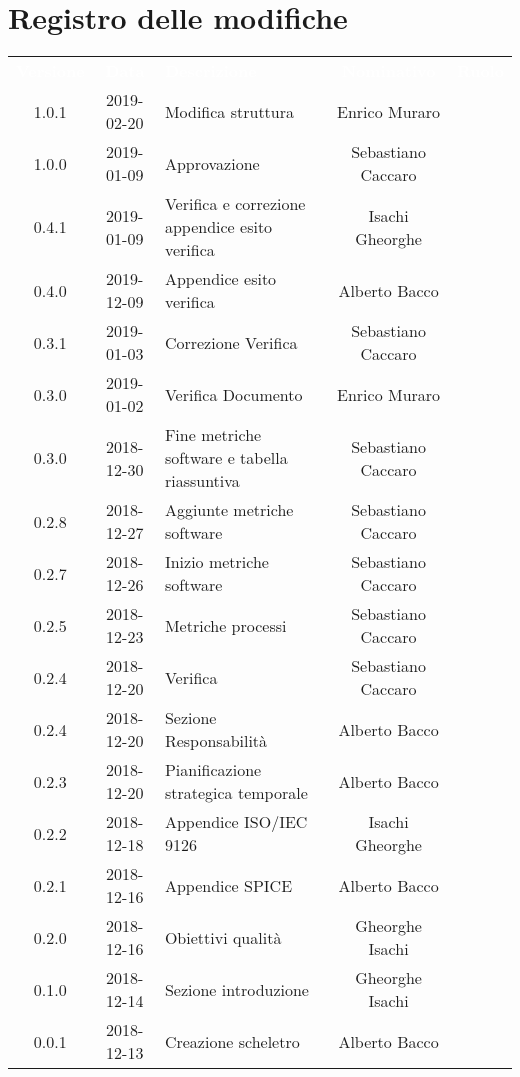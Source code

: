 \section*{Registro delle modifiche}
{
	\renewcommand{\arraystretch}{1.5}
	\centering
	\begin{longtable}{c c C{4cm} c  c }
		\textcolor{white}{\textbf{Versione}} &
		\textcolor{white}{\textbf{Data}} &
		\textcolor{white}{\textbf{Descrizione}} &
		\textcolor{white}{\textbf{Nominativo}} &
		\textcolor{white}{\textbf{Ruolo}}
		\\
		1.0.1 &
		2019-02-20 &
		Modifica struttura &
		Enrico Muraro &
		\reda{}
		\\
		1.0.0 &
		2019-01-09 &
		Approvazione &
		Sebastiano Caccaro &
		\Res{}
		\\
		0.4.1 &
		2019-01-09 &
		Verifica e correzione appendice esito verifica &
		Isachi Gheorghe &
		\ver{}
		\\
		0.4.0 &
		2019-12-09 &
		Appendice esito verifica &
		Alberto Bacco &
		\ver{}
		\\
		0.3.1 &
		2019-01-03 &
		Correzione Verifica &
		Sebastiano Caccaro &
		\reda{}
		\\
		0.3.0 &
		2019-01-02 &
		Verifica Documento &
		Enrico Muraro &
		\ver{}
		\\
		0.3.0 &
		2018-12-30 &
		Fine metriche software e tabella riassuntiva &
		Sebastiano Caccaro &
		\reda{}
		\\
		0.2.8 &
		2018-12-27 &
		Aggiunte metriche software  &
		Sebastiano Caccaro &
		\reda{}
		\\
		0.2.7 &
		2018-12-26 &
		Inizio metriche software &
		Sebastiano Caccaro &
		\reda{}
		\\
		0.2.5 &
		2018-12-23 &
		Metriche processi &
		Sebastiano Caccaro &
		\reda{}
		\\
		0.2.4 &
		2018-12-20 &
		Verifica &
		Sebastiano Caccaro &
		\reda{}		
		\\
		0.2.4 &
		2018-12-20 &
		Sezione Responsabilità &
		Alberto Bacco &
		\reda{}
		\\
		0.2.3 &
		2018-12-20 &
		Pianificazione strategica temporale &
		Alberto Bacco &
		\reda{}
		\\
		0.2.2 &
		2018-12-18 &
		Appendice ISO/IEC 9126 &
		Isachi Gheorghe &
		\reda{}
		\\
		0.2.1 &
		2018-12-16 &
		Appendice SPICE &
		Alberto Bacco &
		\reda{}
		\\
		0.2.0 &
		2018-12-16 &
		Obiettivi qualità &
		Gheorghe Isachi &
		\reda{}
		\\
		0.1.0 &
		2018-12-14 &
		Sezione introduzione &
		Gheorghe Isachi&
		\reda{}
		\\
		0.0.1 &
		2018-12-13 &
		Creazione scheletro &
		Alberto Bacco&
		\reda{}
		\\
	\end{longtable}

}